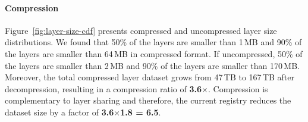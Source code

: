 %
%


%

\paragraph{Compression}
%
Figure~\ref{fig:layer-size-cdf} presents compressed and uncompressed layer size
distributions.
%
We found that 50\% of the layers are smaller than 1\,MB and 90\% of the layers are
smaller than 64\,MB in compressed format.
%
If uncompressed, 50\% of the layers are smaller than 2\,MB and 90\% of the
layers are smaller than 170\,MB.
%
Moreover, the total compressed layer dataset grows from 47\,TB to 167\,TB after
decompression, resulting in a compression ratio of \textbf{3.6$\times$}.
%
Compression is complementary to layer sharing and therefore, the current registry
reduces the dataset size by a factor of \textbf{3.6$\times$1.8 = 6.5}.

